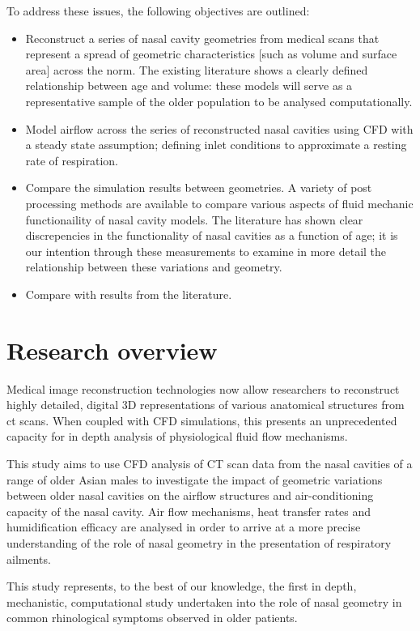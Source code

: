 To address these issues, the following objectives are outlined:

\begin{itemize}

  \item Reconstruct a series of nasal cavity geometries from medical scans that represent a spread of geometric characteristics [such as volume and surface area] across the norm. The existing literature shows a clearly defined relationship between age and volume: these models will serve as a representative sample of the older population to be analysed computationally.

  \item Model airflow across the series of reconstructed nasal cavities using CFD with a steady state assumption; defining inlet conditions to approximate a resting rate of respiration. 

  \item Compare the simulation results between geometries. A variety of post processing methods are available to compare various aspects of fluid mechanic functionaility of nasal cavity models. The literature has shown clear discrepencies in the functionality of nasal cavities as a function of age; it is our intention through these measurements to examine in more detail the relationship between these variations and geometry.

  \item  Compare with results from the literature. 
\end{itemize}
 
\section{Research overview}

Medical image reconstruction technologies now allow researchers to reconstruct highly detailed, digital 3D representations of various anatomical structures from ct scans. When coupled with CFD simulations, this presents an unprecedented capacity for in depth analysis of physiological fluid flow mechanisms.

This study aims to use CFD analysis of CT scan data from the nasal cavities of a range of older Asian males to investigate the impact of geometric variations between older nasal cavities on the airflow structures and air-conditioning capacity of the nasal cavity. Air flow mechanisms, heat transfer rates and humidification efficacy are analysed in order to arrive at a more precise understanding of the role of nasal geometry in the presentation of respiratory ailments.

This study represents, to the best of our knowledge, the first in depth, mechanistic, computational study undertaken into the role of nasal geometry in common rhinological symptoms observed in older patients.




